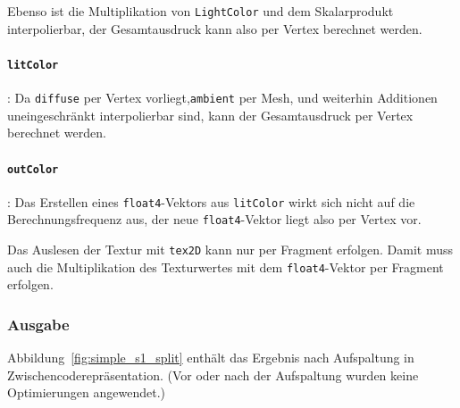 \documentclass[twoside,a4paper,fleqn,12pt]{book}
\begin{document}
Ebenso ist die Multiplikation von \texttt{LightColor} und dem Skalarprodukt interpolierbar, der Gesamtausdruck kann also per Vertex
berechnet werden.

\paragraph{\texttt{litColor}}: Da \texttt{diffuse} per Vertex vorliegt,\texttt{ambient} per Mesh, und weiterhin
Additionen uneingeschränkt interpolierbar sind, kann der Gesamtausdruck per Vertex berechnet werden.

\paragraph{\texttt{outColor}}: Das Erstellen eines \texttt{float4}-Vektors aus \texttt{litColor} wirkt sich nicht 
auf die Berechnungsfrequenz aus, der neue \texttt{float4}-Vektor liegt also per Vertex vor.

Das Auslesen der Textur mit \texttt{tex2D} kann nur per Fragment erfolgen. Damit muss auch die Multiplikation des Texturwertes mit
dem \texttt{float4}-Vektor per Fragment erfolgen.

\subsubsection{Ausgabe}

Abbildung~\ref{fig:simple_s1_split} enthält das Ergebnis nach Aufspaltung in Zwischencoderepräsentation.
(Vor oder nach der Aufspaltung wurden keine Optimierungen angewendet.)
\end{document}
